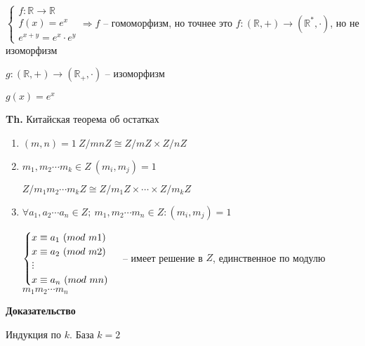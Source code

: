 \documentclass[14pt, letter paper]{article}
\def\divby{%
  \mathrel{\text{\vbox{\baselineskip.65ex\lineskiplimit0pt\hbox{.}\hbox{.}\hbox{.}}}}%
}
\begin{document}
$\begin{cases}
    f: \mathds{R} \rightarrow \mathds{R} \\
    f(x) = e^x \\
    e^{x+y} = e^x \cdot e^y
\end{cases} \Rightarrow f$ -- гомоморфизм, но точнее это $f : (\mathds{R}, +) \rightarrow (\mathds{R}^*, \cdot)$, но не изоморфизм

$g: (\mathds{R}, +) \rightarrow (\mathds{R}_+, \cdot)$ -- изоморфизм

$g(x) = e^x$

\textbf{Th.} Китайская теорема об остатках

\begin{enumerate}
    \item $(m, n) = 1\ Z/mnZ \cong Z/mZ \times Z/nZ$
    \item $m_1, m_2 \cdots m_k \in Z\ (m_i, m_j) = 1$

    $Z/m_1m_2\cdots m_kZ \cong Z/m_1Z \times \cdots \times Z/m_kZ$

    \item $\forall a_1, a_2 \cdots a_n \in Z;\ m_1, m_2 \cdots m_n \in Z : (m_i, m_j) = 1$

    $\begin{cases}
        x \equiv a_1\ (mod\ m1) \\
        x \equiv a_2\ (mod\ m2) \\
        \divby \\
        x \equiv a_n\ (mod\ mn) \\
    \end{cases}$ -- имеет решение в $Z$, единственное по модулю $m_1 m_2 \cdots m_n$
\end{enumerate}

\begin{center}
    \textbf{Доказательство}
\end{center}

Индукция по $k$. База $k = 2$
\end{document}
